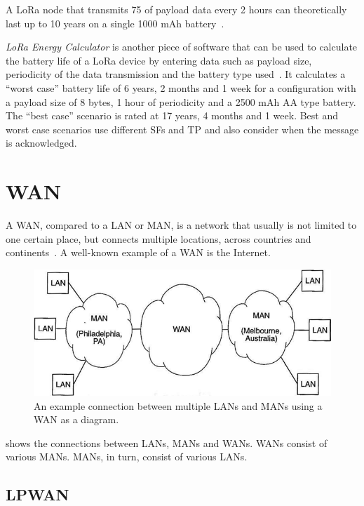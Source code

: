 A \ac{LoRa} node that transmits \SI{75}{\byte} of payload data every 2 hours can theoretically last up to 10 years on a single 1000 mAh battery~\cite{cheong_comparison_2017}.

\emph{LoRa Energy Calculator} is another piece of software that can be used to calculate the battery life of a \ac{LoRa} device by entering data such as payload size, periodicity of the data transmission and the battery type used~\cite{dramco_research_group_lora_2023}.
It calculates a ``worst case'' battery life of 6 years, 2 months and 1 week for a configuration with a payload size of 8 bytes, 1 hour of periodicity and a 2500 mAh AA type battery.
The ``best case'' scenario is rated at 17 years, 4 months and 1 week.
Best and worst case scenarios use different \aclp{SF} and \ac{TP} and also consider when the message is acknowledged.

\section{\acf{WAN}}

A \ac{WAN}, compared to a \acf{LAN} or \acf{MAN}, is a network that usually is not limited to one certain place, but connects multiple locations, across countries and continents~\cite[p. 2]{sadiku_fundamentals_2022}.
A well-known example of a \ac{WAN} is the Internet.

\begin{figure}[htbp]
    \centering
    \includegraphics[width=.6\textwidth]{pictures/lorawan-structure/wan_diagram.png}
    \caption{
        An example connection between multiple \acfp{LAN} and \acfp{MAN} using a \acf{WAN} as a diagram.\protect\cite{sadiku_fundamentals_2022}
    }\label{pic:wan-diagram}
\end{figure}

 shows the connections between \acfp{LAN}, \acfp{MAN} and \acfp{WAN}.
\acp{WAN} consist of various \acp{MAN}.
\acp{MAN}, in turn, consist of various \acp{LAN}.

\subsection{\acf{LPWAN}}

